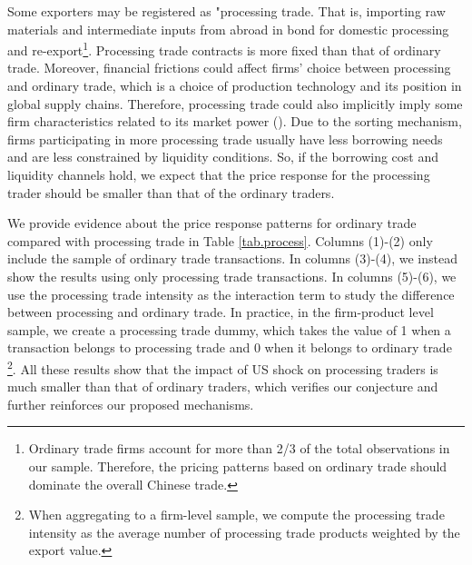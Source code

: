Some exporters may be registered as "processing trade. That is, importing raw materials and intermediate inputs from abroad in bond for domestic processing and re-export\footnote{ Ordinary trade firms account for more than 2/3 of the total observations in our sample. Therefore, the pricing patterns based on ordinary trade should dominate the overall Chinese trade.}. Processing trade contracts is more fixed than that of ordinary trade. Moreover, financial frictions could affect firms' choice between processing and ordinary trade, which is a choice of production technology and its position in global supply chains. Therefore, processing trade could also implicitly imply some firm characteristics related to its market power (\cite{manova2016firms}). Due to the sorting mechanism, firms participating in more processing trade usually have less borrowing needs and are less constrained by liquidity conditions. So, if the borrowing cost and liquidity channels hold, we expect that the price response for the processing trader should be smaller than that of the ordinary traders. 

We provide evidence about the price response patterns for ordinary trade compared with processing trade in Table \ref{tab.process}. Columns (1)-(2) only include the sample of ordinary trade transactions. In columns (3)-(4), we instead show the results using only processing trade transactions. In columns (5)-(6), we use the processing trade intensity as the interaction term to study the difference between processing and ordinary trade. In practice, in the firm-product level sample, we create a processing trade dummy, which takes the value of 1 when a transaction belongs to processing trade and 0 when it belongs to ordinary trade \footnote{When aggregating to a firm-level sample, we compute the processing trade intensity as the average number of processing trade products weighted by the export value.}. All these results show that the impact of US shock on processing traders is much smaller than that of ordinary traders, which verifies our conjecture and further reinforces our proposed mechanisms.

